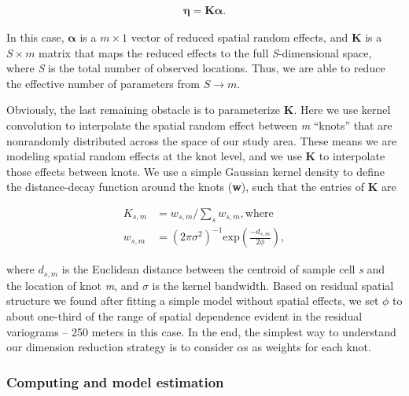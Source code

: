 \documentclass[12pt,]{article}
\begin{document}
\begin{align}
\boldsymbol{\eta} = \textbf{K}\boldsymbol{\alpha}.
\end{align}

In this case, \(\boldsymbol{\alpha}\) is a \(m \times 1\) vector of
reduced spatial random effects, and \textbf{K} is a \(S \times m\)
matrix that maps the reduced effects to the full \emph{S}-dimensional
space, where \emph{S} is the total number of observed locations. Thus,
we are able to reduce the effective number of parameters from
\({S} \rightarrow m\).

Obviously, the last remaining obstacle is to parameterize \textbf{K}.
Here we use kernel convolution to interpolate the spatial random effect
between \emph{m} ``knots'' that are nonrandomly distributed across the
space of our study area. These means we are modeling spatial random
effects at the knot level, and we use \textbf{K} to interpolate those
effects between knots. We use a simple Gaussian kernel density to define
the distance-decay function around the knots (\textbf{w}), such that the
entries of \textbf{K} are

\begin{align}
K_{s,m} &= w_{s,m}/\sum_{s} w_{s,m}, \text{where} \\
w_{s,m} &= (2 \pi \sigma^{2})^{-1} \text{exp}(\frac{-d_{s,m}}{2 \phi}),
\end{align}

where \(d_{s,m}\) is the Euclidean distance between the centroid of
sample cell \emph{s} and the location of knot \emph{m}, and \(\sigma\)
is the kernel bandwidth. Based on residual spatial structure we found
after fitting a simple model without spatial effects, we set \(\phi\) to
about one-third of the range of spatial dependence evident in the
residual variograms -- 250 meters in this case. In the end, the simplest
way to understand our dimension reduction strategy is to consider
\(\alpha\)s as weights for each knot.

\subsubsection*{Computing and model
estimation}\label{computing-and-model-estimation}
\end{document}
